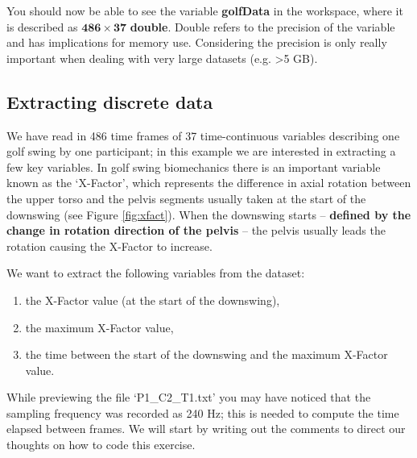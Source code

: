 \documentclass[12pt,a4paper]{article}
\begin{document}
You should now be able to see the variable \textbf{golfData} in the workspace, where it is described as $\mathbf{486\times37}$ \textbf{double}. 
Double refers to the precision of the variable and has implications for memory use.
Considering the precision is only really important when dealing with very large datasets (e.g. >5 GB).

\subsection{Extracting discrete data}
We have read in 486 time frames of 37 time-continuous variables describing one golf swing by one participant; in this example we are interested in extracting a few key variables.
In golf swing biomechanics there is an important variable known as the `X-Factor', which represents the difference in axial rotation between the upper torso and the pelvis segments usually taken at the start of the downswing (see Figure \ref{fig:xfact}).
When the downswing starts -- \textbf{defined by the change in rotation direction of the pelvis} -- the pelvis usually leads the rotation causing the X-Factor to increase.

We want to extract the following variables from the dataset:
\begin{enumerate}
	\item the X-Factor value (at the start of the downswing),
	\item the maximum X-Factor value,
	\item the time between the start of the downswing and the maximum X-Factor value.
\end{enumerate}

While previewing the file `P1\_C2\_T1.txt' you may have noticed that the sampling frequency was recorded as 240 Hz; this is needed to compute the time elapsed between frames.
We will start by writing out the comments to direct our thoughts on how to code this exercise.
\end{document}
